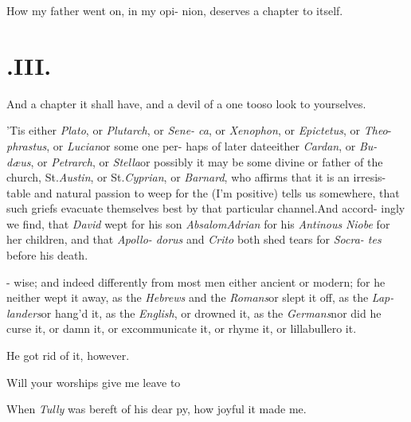 \documentclass[twoside]{article}
\begin{document}
How my father went on, in my opi-\break
nion, deserves a chapter to itself.\tsk

\section{.\enspace  III.}

\setlength{\baselineskip}{12.25pt}  %

\quad \tsh \quad \tsh \quad And a chapter it\break 
shall have, and a devil of a one too\tsk so\break 
look to yourselves.

’Tis either \textit{Plato}, or \textit{Plutarch}, or \textit{Sene-\break
ca}, or \textit{Xenophon}, or \textit{Epictetus}, or \textit{Theo}- 
\textit{phrastus}, or \textit{Lucian}\tsk or some one per-\break
haps of later date\tsk either \textit{Cardan}, or \textit{Bu-\break
dæus}, or \textit{Petrarch}, or \textit{Stella}\tsk or possibly\break
it may be some divine or father of the\break
church, St.\@ \textit{Austin}, or St.\@ \textit{Cyprian}, or\break
\textit{Barnard}, who affirms that it is an irresis-\break
table and natural passion to weep for the\break
{}\break
(I’m positive) tells us somewhere, that\break
such griefs evacuate themselves best by\break
that particular channel.\tsk And accord-\break
ingly we find, that \textit{David} wept for his\break
son \textit{Absalom}\tsk \textit{Adrian} for his \textit{Antinous}\tsk\break
\textit{Niobe} for her children, and that \textit{Apollo-\break
dorus} and \textit{Crito} both shed tears for \textit{Socra-\break
tes} before his death.

-\break
wise; and indeed differently from most\break
men either ancient or modern; for he\break
neither wept it away, as the \textit{Hebrews} and\break
the \textit{Romans}\tsk or slept it off, as the \textit{Lap-\break
landers}\tsk or hang’d it, as the \textit{English}, or\break
drowned it, as the \textit{Germans}\tsk nor did he 
curse it, or damn it, or excommunicate\break 
it, or rhyme it, or lillabullero it.\tsh

\tsh  He got rid of it, however.

Will your worships give me leave to\break
{}

When \textit{Tully} was bereft of his dear\break
{}
py, how joyful it made me.
\end{document}
